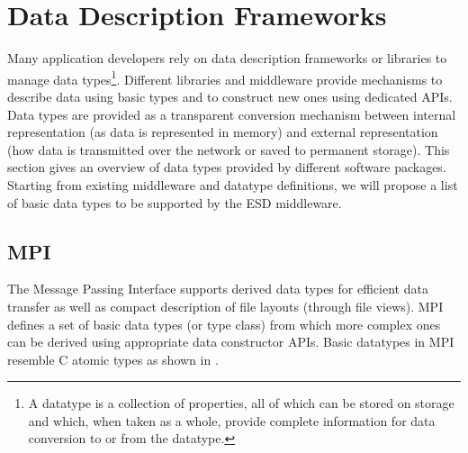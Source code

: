 \section{Data Description Frameworks}
\label{sec: data-formats}


Many application developers rely on data description frameworks or libraries to manage data types\footnote{A datatype is a collection of properties, all of which can be stored on storage and which, when taken as a whole, provide complete information for data conversion to or from the datatype.}.
Different libraries and middleware provide mechanisms to describe data using basic types and to construct new ones using dedicated APIs.
Data types are provided as a transparent conversion mechanism between internal representation (as data is represented in memory) and external representation (how data is transmitted over the network or saved to permanent storage).
This section gives an overview of data types provided by different software packages.
Starting from existing middleware and datatype definitions, we will propose a list of basic data types to be supported by the ESD middleware.


\subsection{MPI}
The Message Passing Interface supports derived data types for efficient data transfer as well as compact description of file layouts (through file views). MPI defines a set of basic data types (or type class) from which more complex ones can be derived using appropriate data constructor APIs. Basic datatypes in MPI resemble C atomic types as shown in .

\clearpage

